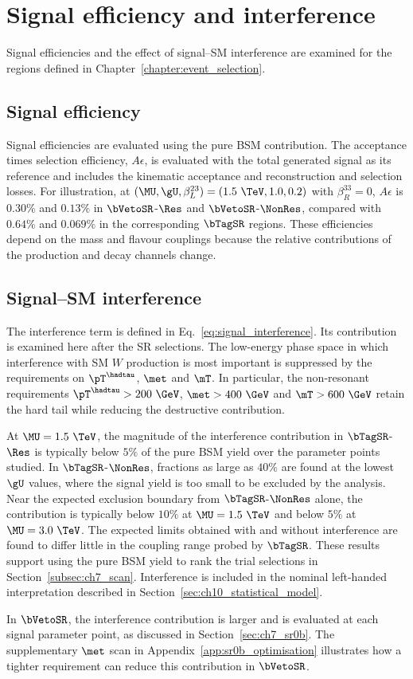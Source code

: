 \chapter{Signal efficiency and interference}
\label{app:signal_interference_study}

Signal efficiencies and the effect of signal--SM interference are examined for the regions defined in Chapter~\ref{chapter:event_selection}.

\section{Signal efficiency}
\label{app:signal_efficiency}

Signal efficiencies are evaluated using the pure BSM contribution.
The acceptance times selection efficiency, $A\epsilon$, is evaluated with the total generated signal as its reference and includes the kinematic acceptance and reconstruction and selection losses.
For illustration, at $(\MU,\gU,\beta_L^{23})=(1.5~\TeV,1.0,0.2)$ with $\beta_R^{33}=0$, $A\epsilon$ is $0.30\%$ and $0.13\%$ in $\bVetoSR$-$\Res$ and $\bVetoSR$-$\NonRes$, compared with $0.64\%$ and $0.069\%$ in the corresponding $\bTagSR$ regions.
These efficiencies depend on the mass and flavour couplings because the relative contributions of the production and decay channels change.

\section{Signal--SM interference}

The interference term is defined in Eq.~\eqref{eq:signal_interference}. Its contribution is examined here after the SR selections.
The low-energy phase space in which interference with SM $W$ production is most important is suppressed by the requirements on $\pT^{\hadtau}$, $\met$ and $\mT$.
In particular, the non-resonant requirements $\pT^{\hadtau}>200~\GeV$, $\met>400~\GeV$ and $\mT>600~\GeV$ retain the hard tail while reducing the destructive contribution.

At $\MU=1.5~\TeV$, the magnitude of the interference contribution in $\bTagSR$-$\Res$ is typically below $5\%$ of the pure BSM yield over the parameter points studied.
In $\bTagSR$-$\NonRes$, fractions as large as $40\%$ are found at the lowest $\gU$ values, where the signal yield is too small to be excluded by the analysis.
Near the expected exclusion boundary from $\bTagSR$-$\NonRes$ alone, the contribution is typically below $10\%$ at $\MU=1.5~\TeV$ and below $5\%$ at $\MU=3.0~\TeV$.
The expected limits obtained with and without interference are found to differ little in the coupling range probed by $\bTagSR$.
These results support using the pure BSM yield to rank the trial selections in Section~\ref{subsec:ch7_scan}.
Interference is included in the nominal left-handed interpretation described in Section~\ref{sec:ch10_statistical_model}.

In $\bVetoSR$, the interference contribution is larger and is evaluated at each signal parameter point, as discussed in Section~\ref{sec:ch7_sr0b}.
The supplementary $\met$ scan in Appendix~\ref{app:sr0b_optimisation} illustrates how a tighter requirement can reduce this contribution in $\bVetoSR$.

